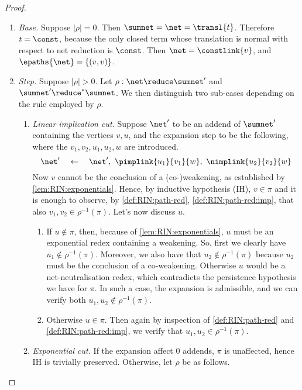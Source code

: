 \begin{proof}
\begin{itemize}
  \begin{enumerate}
  \item \textit{Base.}
    Suppose $|\rho|=0$.
    Then $\sumnet=\net=\transl{t}$.
    Therefore $t = \const$, because the only closed term whose translation is 
    normal with respect to net reduction is $\const$.
    Then $\net = \constlink{v}$, and $\epaths{\net} = \lbrace (v,v) \rbrace$.
  \item \textit{Step.}
    Suppose $|\rho| > 0$.
    Let $\rho: \net \reduce \sumnet'$ and $\sumnet' \reduce^* \sumnet$.
    We then distinguish two sub-cases depending on the rule employed by $\rho$.
    \begin{enumerate}
    \item \textit{Linear implication cut.}
      Suppose $\net'$ to be an addend of $\sumnet'$ containing the 
      vertices $v,u$, and the expansion step to be the following, where the 
      $v_1,v_2,u_1,u_2,w$ are introduced.
      \[\net'
        \quad\leftarrow\quad
        \net',\ \pimplink{u_1}{v_1}{w},\ \nimplink{u_2}{v_2}{w}\]
      Now $v$ cannot be the conclusion of a (co-)weakening,
      as established by \autoref{lem:RIN:exponentials}.
      Hence, by inductive hypothesis (IH), $v \in \pi$ and it is enough to 
      observe, by \autoref{def:RIN:path-red}, \autoref{def:RIN:path-red:imp},
      that also $v_1,v_2 \in \rho^{-1}(\pi)$.
      Let's now discuss $u$.
      \begin{enumerate}
      \item If $u \notin \pi$, then,
        because of \autoref{lem:RIN:exponentials}, 
        $u$ must be an exponential redex containing a weakening.
        So, first we clearly have $u_1 \notin \rho^{-1}(\pi)$.
        Moreover, we also have that $u_2 \notin \rho^{-1}(\pi)$ because 
        $u_2$ must be the conclusion of a co-weakening.
        Otherwise $u$ would be a net-neutralisation redex,
        which contradicts the persistence hypothesis we have for $\pi$.
        In such a case, the expansion is admissible, and we can verify both
        $u_1,u_2 \notin \rho^{-1}(\pi)$.
      \item Otherwise $u \in \pi$.
        Then again by inspection of
        \autoref{def:RIN:path-red} and \ref{def:RIN:path-red:imp},
        we verify that $u_1,u_2 \in \rho^{-1}(\pi)$.
      \end{enumerate}
    \item \textit{Exponential cut.}
      If the expansion affect $0$ addends,
      $\pi$ is unaffected, hence IH is trivially preserved.
      Otherwise, let $\rho$ be as follows.

\end{enumerate}
\end{enumerate}
\end{itemize}
\end{proof}
